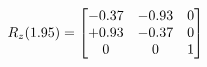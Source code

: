\documentclass[preview]{standalone}
\begin{document}
\begin{align*}
\special{dvisvgm:raw <g id='unique000'>}R_{z}(1.95) = \begin{bmatrix}-0.37 & -0.93 & 0 \\+0.93 & -0.37 & 0 \\0 & 0 & 1\end{bmatrix}\special{dvisvgm:raw </g>}
\end{align*}
\end{document}
